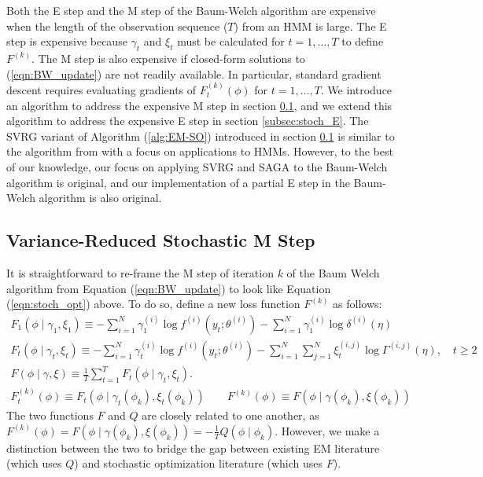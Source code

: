 
Both the E step and the M step of the Baum-Welch algorithm are expensive when the length of the observation sequence ($T$) from an HMM is large. The E step is expensive because $\gamma_t$ and $\xi_t$ must be calculated for $t = 1,\ldots,T$ to define $F^{(k)}$. The M step is also expensive if closed-form solutions to (\ref{eqn:BW_update}) are not readily available. In particular, standard gradient descent requires evaluating gradients of $F^{(k)}_t(\phi)$ for $t = 1,\ldots,T$. We introduce an algorithm to address the expensive M step in section \ref{subsec:stoch_M}, and we extend this algorithm to address the expensive E step in section \ref{subsec:stoch_E}. The SVRG variant of Algorithm (\ref{alg:EM-SO}) introduced in section \ref{subsec:stoch_M} is similar to the algorithm from \citet{Zhu:2017} with a focus on applications to HMMs. However, to the best of our knowledge, our focus on applying SVRG and SAGA to the Baum-Welch algorithm is original, and our implementation of a partial E step in the Baum-Welch algorithm is also original. 

\subsection{Variance-Reduced Stochastic M Step}
\label{subsec:stoch_M}

It is straightforward to re-frame the M step of iteration $k$ of the Baum Welch algorithm from Equation (\ref{eqn:BW_update}) to look like Equation (\ref{eqn:stoch_opt}) above. To do so, define a new loss function $F^{(k)}$ as follows:
%
\begin{gather}
    F_1(\phi \mid \gamma_1,\xi_1) \equiv - \sum_{i=1}^N \gamma^{(i)}_1 \log f^{(i)}(y_t;\theta^{(i)}) - \sum_{i=1}^N \gamma^{(i)}_1 \log \delta^{(i)}(\eta) \\
    F_t(\phi \mid \gamma_t , \xi_t) \equiv - \sum_{i=1}^N \gamma^{(i)}_t \log f^{(i)}(y_t;\theta^{(i)}) - \sum_{i=1}^N \sum_{j=1}^N \xi^{(i,j)}_t \log \Gamma^{(i,j)}(\eta), \quad t \geq 2 \\
    F(\phi \mid \gamma, \xi) \equiv \frac{1}{T}\sum_{t=1}^T F_t(\phi \mid \gamma_t , \xi_t). \\
    F_t^{(k)}(\phi) \equiv F_t(\phi \mid \gamma_t(\phi_k) , \xi_t(\phi_k)) \qquad F^{(k)}(\phi) \equiv F(\phi \mid \gamma(\phi_k), \xi(\phi_k))
\end{gather}
%
%
The two functions $F$ and $Q$ are closely related to one another, as $F^{(k)}(\phi) = F(\phi \mid \gamma(\phi_k), \xi(\phi_k)) = - \frac{1}{T} Q(\phi \mid \phi_k)$. However, we make a distinction between the two to bridge the gap between existing EM literature (which uses $Q$) and stochastic optimization literature (which uses $F$).

